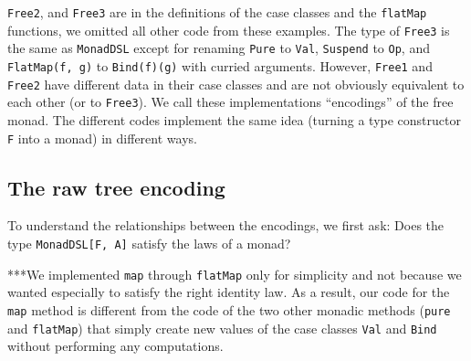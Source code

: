 \lstinline!Free2!, and
\lstinline!Free3! are in
the definitions of the case classes and the \lstinline!flatMap!
functions, we omitted all other code from these examples. The type
of \lstinline!Free3! is
the same as \lstinline!MonadDSL!
except for renaming \lstinline!Pure!
to \lstinline!Val!, \lstinline!Suspend!
to \lstinline!Op!, and
\lstinline!FlatMap(f, g)!
to \lstinline!Bind(f)(g)!
with curried arguments. However, \lstinline!Free1!
and \lstinline!Free2! have
different data in their case classes and are not obviously equivalent
to each other (or to \lstinline!Free3!).
We call these implementations \textsf{``}encodings\textsf{''} of the free monad. The
different codes implement the same idea (turning a type constructor
\lstinline!F! into a monad)
in different ways.

\subsection{The raw tree encoding}

To understand the relationships between the encodings, we first ask:
Does the type \lstinline!MonadDSL[F, A]!
satisfy the laws of a monad? 

{*}{*}{*}We implemented \lstinline!map!
through \lstinline!flatMap!
only for simplicity and not because we wanted especially to satisfy
the right identity law. As a result, our code for the \lstinline!map!
method is different from the code of the two other monadic methods
(\lstinline!pure! and \lstinline!flatMap!)
that simply create new values of the case classes \lstinline!Val!
and \lstinline!Bind! without
performing any computations.

